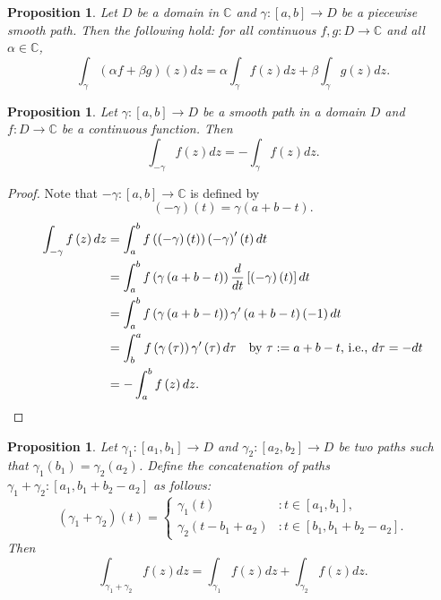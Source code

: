 \documentclass[12pt,openany]{book}
\newtheorem{proposition}[theorem]{Proposition}
\theoremstyle{definition}
\newcommand{\C}{\mathbb{C}}
\newcommand{\of}[1]{\left( #1 \right)}
\newcommand{\ie}{\textnormal{i.e.}}
\begin{document}
	\begin{tcolorbox}[colback=white,colframe=procolor,arc=5pt,title={\color{white}\bf Linearity of Integration}]
		\begin{proposition}
			Let $D$ be a domain in $\C$ and $\gamma:[a,b]\to D$ be a piecewise smooth path. Then the following hold: for all continuous $f,g:D\to\C$ and all $\alpha\in\C$, \[
			\int_\gamma\left(\alpha f+\beta g\right)\of{z}dz=\alpha\int_\gamma f\of{z}dz+\beta\int_\gamma g\of{z}dz.
			\]
		\end{proposition}
	\end{tcolorbox}
	\vspace{4pt}
	\begin{tcolorbox}[colback=white,colframe=procolor,arc=5pt,title={\color{white}\bf }]
		\begin{proposition}
			Let $\gamma:[a,b]\to D$ be a smooth path in a domain $D$ and $f:D\to\C$ be a continuous function. Then \[
			\int_{-\gamma}f\of{z}dz = -\int_{\gamma}f\of{z}dz.
			\]
		\end{proposition}
	\end{tcolorbox}
	\begin{proof}
		Note that $-\gamma:[a,b]\to\C$ is defined by \[
		\of{-\gamma}\of{t}=\gamma\of{a+b-t}.
		\]\begin{align*}
			\int_{-\gamma}f\of{z}dz &=\int_a^bf\of{\of{-\gamma}\of{t}}\of{-\gamma}'\of{t}dt\\
			&=\int_a^bf\of{\gamma\of{a+b-t}}\frac{d}{dt}\left[\of{-\gamma}\of{t}\right]dt\\
			&=\int_a^bf\of{\gamma\of{a+b-t}}\gamma'\of{a+b-t}\of{-1}dt\\
			&=\int_b^af\of{\gamma\of{\tau}}\gamma'\of{\tau}d\tau\quad\text{by $\tau:=a+b-t$, \ie, $d\tau=-dt$}\\
			&=-\int_a^bf\of{z}dz.
		\end{align*}
	\end{proof}
	\vspace{4pt}
	\begin{tcolorbox}[colback=white,colframe=procolor,arc=5pt,title={\color{white}\bf Concatenation of Paths}]
		\begin{proposition}
			Let $\gamma_1:[a_1,b_1]\to D$ and $\gamma_2:[a_2,b_2]\to D$ be two paths such that $\gamma_1\of{b_1}=\gamma_2\of{a_2}$. Define the concatenation of paths $\gamma_1+\gamma_2:\left[a_1,b_1+b_2-a_2\right]$ as follows: \[
			\of{\gamma_1+\gamma_2}\of{t}=\begin{cases}
				\gamma_1\of{t} &:t\in[a_1,b_1],\\
				\gamma_2\of{t-b_1+a_2} &:t\in[b_1,b_1+b_2-a_2].
			\end{cases}
			\] Then \[
			\int_{\gamma_1+\gamma_2}f\of{z}dz=\int_{\gamma_1}f\of{z}dz+\int_{\gamma_2}f\of{z}dz.
			\]
		\end{proposition}
	\end{tcolorbox}
\end{document}
